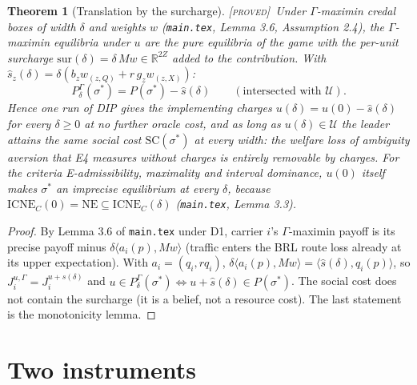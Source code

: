 \documentclass[11pt]{article}
\newtheorem{theorem}{Theorem}
\theoremstyle{definition}
\theoremstyle{remark}
\newcommand{\R}{\mathbb{R}}
\newcommand{\cU}{\mathcal{U}}
\newcommand{\ip}[2]{\langle #1,#2\rangle}
\newcommand{\SC}{\mathrm{SC}}
\newcommand{\NE}{\mathrm{NE}}
\newcommand{\ICNE}{\mathrm{ICNE}}
\newcommand{\PROVED}{{\normalfont\textsc{[proved]}}}
\begin{document}
\begin{theorem}[Translation by the surcharge]\label{thm:credal}\PROVED\
Under $\Gamma$-maximin credal boxes of width $\delta$ and weights $w$ (\texttt{main.tex}, Lemma 3.6, Assumption 2.4), the $\Gamma$-maximin equilibria under $u$ are the pure equilibria of the game with the per-unit surcharge $\mathrm{sur}(\delta)=\delta\,Mw\in\R^{2Z}$ added to the contribution. With $\hat s_z(\delta)=\delta(b_zw_{(z,Q)}+r\,g_zw_{(z,X)})$:
\[P^{\Gamma}_\delta(\sigma^*)=P(\sigma^*)-\hat s(\delta)\qquad(\text{intersected with }\cU).\]
Hence one run of DIP gives the implementing charges $u(\delta)=u(0)-\hat s(\delta)$ for every $\delta\ge0$ at no further oracle cost, and as long as $u(\delta)\in\cU$ the leader attains the same social cost $\SC(\sigma^*)$ at every width: the welfare loss of ambiguity aversion that E4 measures without charges is entirely removable by charges. For the criteria E-admissibility, maximality and interval dominance, $u(0)$ itself makes $\sigma^*$ an imprecise equilibrium at every $\delta$, because $\ICNE_C(0)=\NE\subseteq\ICNE_C(\delta)$ (\texttt{main.tex}, Lemma 3.3).
\end{theorem}
\begin{proof}
By Lemma 3.6 of \texttt{main.tex} under D1, carrier $i$'s $\Gamma$-maximin payoff is its precise payoff minus $\delta\ip{a_i(p)}{Mw}$ (traffic enters the BRL route loss already at its upper expectation). With $a_i=(q_i,rq_i)$, $\delta\ip{a_i(p)}{Mw}=\ip{\hat s(\delta)}{q_i(p)}$, so $J^{u,\Gamma}_i=J^{u+\hat s(\delta)}_i$ and $u\in P^\Gamma_\delta(\sigma^*)\iff u+\hat s(\delta)\in P(\sigma^*)$. The social cost does not contain the surcharge (it is a belief, not a resource cost). The last statement is the monotonicity lemma.
\end{proof}

\section{Two instruments}
\end{document}
